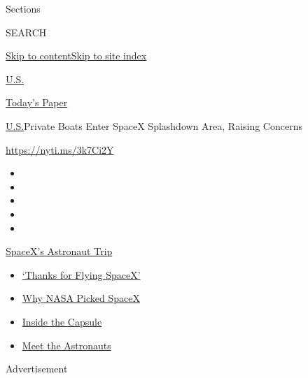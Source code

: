 Sections

SEARCH

\protect\hyperlink{site-content}{Skip to
content}\protect\hyperlink{site-index}{Skip to site index}

\href{https://www.nytimes3xbfgragh.onion/section/us}{U.S.}

\href{https://myaccount.nytimes3xbfgragh.onion/auth/login?response_type=cookie\&client_id=vi}{}

\href{https://www.nytimes3xbfgragh.onion/section/todayspaper}{Today's
Paper}

\href{/section/us}{U.S.}\textbar{}Private Boats Enter SpaceX Splashdown
Area, Raising Concerns

\url{https://nyti.ms/3k7Ci2Y}

\begin{itemize}
\item
\item
\item
\item
\item
\end{itemize}

\href{https://www.nytimes3xbfgragh.onion/2020/08/02/science/spacex-astronauts-splashdown.html?action=click\&pgtype=Article\&state=default\&region=TOP_BANNER\&context=storylines_menu}{SpaceX's
Astronaut Trip}

\begin{itemize}
\tightlist
\item
  \href{https://www.nytimes3xbfgragh.onion/2020/08/02/science/spacex-astronauts-splashdown.html?action=click\&pgtype=Article\&state=default\&region=TOP_BANNER\&context=storylines_menu}{`Thanks
  for Flying SpaceX'}
\item
  \href{https://www.nytimes3xbfgragh.onion/2020/05/26/science/spacex-launch-nasa.html?action=click\&pgtype=Article\&state=default\&region=TOP_BANNER\&context=storylines_menu}{Why
  NASA Picked SpaceX}
\item
  \href{https://www.nytimes3xbfgragh.onion/interactive/2020/05/26/science/spacex-nasa.html?action=click\&pgtype=Article\&state=default\&region=TOP_BANNER\&context=storylines_menu}{Inside
  the Capsule}
\item
  \href{https://www.nytimes3xbfgragh.onion/2020/05/27/science/bob-behnken-doug-hurley.html?action=click\&pgtype=Article\&state=default\&region=TOP_BANNER\&context=storylines_menu}{Meet
  the Astronauts}
\end{itemize}

Advertisement

